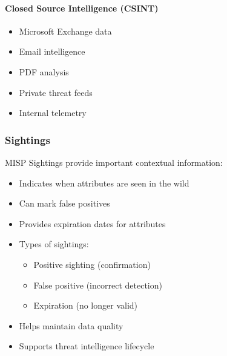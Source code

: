\paragraph{Closed Source Intelligence (CSINT)}
\begin{itemize}
    \item Microsoft Exchange data
    \item Email intelligence
    \item PDF analysis
    \item Private threat feeds
    \item Internal telemetry
\end{itemize}

\subsubsection{Sightings}
MISP Sightings provide important contextual information:
\begin{itemize}
    \item Indicates when attributes are seen in the wild
    \item Can mark false positives
    \item Provides expiration dates for attributes
    \item Types of sightings:
        \begin{itemize}
            \item Positive sighting (confirmation)
            \item False positive (incorrect detection)
            \item Expiration (no longer valid)
        \end{itemize}
    \item Helps maintain data quality
    \item Supports threat intelligence lifecycle
\end{itemize}

